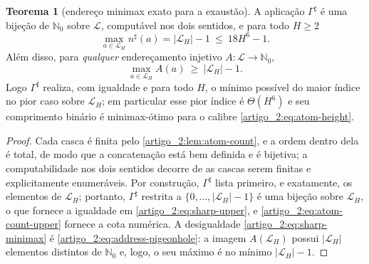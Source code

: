 \documentclass[12pt,a4paper]{article}
\theoremstyle{preciso}
\theoremstyle{definition}
\newcommand{\Nzero}{\mathbb{N}_0}
\newcommand{\Library}{\mathcal{L}}
\theoremstyle{preciso}
\newtheorem{theorem}[teorema]{Teorema}
\theoremstyle{preciso}
\theoremstyle{preciso}
\theoremstyle{preciso}
\theoremstyle{definition}
\theoremstyle{preciso}
\theoremstyle{definition}
\theoremstyle{preciso}
\theoremstyle{preciso}
\theoremstyle{definition}
\begin{document}
\begin{theorem}[endereço minimax exato para a exaustão]\label{map:artigo_2:3.7}\label{artigo_2:thm:sharp-optimal}
A aplicação $\Gamma^\sharp$ é uma bijeção de $\Nzero$ sobre $\Library$, computável nos dois sentidos, e para todo $H\ge2$
\begin{equation}
 \max_{a\in\Library_H}n^\sharp(a)=|\Library_H|-1\ \le\ 18H^6-1 .
 \label{artigo_2:eq:sharp-upper}
\end{equation}
Além disso, para \emph{qualquer} endereçamento injetivo $A:\Library\to\Nzero$,
\begin{equation}
 \max_{a\in\Library_H}A(a)\ \ge\ |\Library_H|-1 .
 \label{artigo_2:eq:sharp-minimax}
\end{equation}
Logo $\Gamma^\sharp$ realiza, com igualdade e para todo $H$, o mínimo possível
do maior índice no pior caso sobre $\Library_H$; em particular esse pior
índice é $\Theta(H^6)$ e seu comprimento binário é minimax-ótimo para o
calibre \eqref{artigo_2:eq:atom-height}.
\end{theorem}

\begin{proof}
Cada casca é finita pelo \cref{artigo_2:lem:atom-count}, e a ordem dentro dela é total, de modo que a concatenação está bem definida e é bijetiva; a computabilidade nos dois sentidos decorre de as cascas serem finitas e explicitamente enumeráveis. Por construção, $\Gamma^\sharp$ lista primeiro, e exatamente, os elementos de $\Library_H$; portanto, $\Gamma^\sharp$ restrita a $\{0,\ldots,|\Library_H|-1\}$ é uma bijeção sobre $\Library_H$, o que fornece a igualdade em \eqref{artigo_2:eq:sharp-upper}, e \eqref{artigo_2:eq:atom-count-upper} fornece a cota numérica. A desigualdade \eqref{artigo_2:eq:sharp-minimax} é \eqref{artigo_2:eq:address-pigeonhole}: a imagem $A(\Library_H)$ possui $|\Library_H|$ elementos distintos de $\Nzero$ e, logo, o seu máximo é no mínimo $|\Library_H|-1$.
\end{proof}
\end{document}
